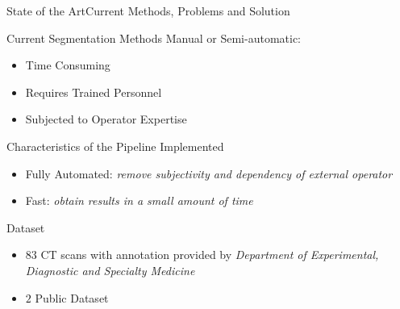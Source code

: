 \documentclass{standalone}
\begin{document}
	
	\begin{frame}{State of the Art}{Current Methods, Problems and Solution}
		
		\begin{alertblock}{Current Segmentation Methods}
			Manual or Semi-automatic: 
			\begin{itemize}
				\item Time Consuming
				\item Requires Trained Personnel
				\item Subjected to Operator Expertise
			\end{itemize}
		\end{alertblock}
		
		\begin{block}{Characteristics of the Pipeline Implemented}
			\begin{itemize}
				\item Fully Automated: \emph{remove subjectivity and dependency of external operator}
				\item Fast: \emph{obtain results in a small amount of time }
			\end{itemize}
		\end{block}
	
		\begin{exampleblock}{Dataset}
			\begin{itemize}
				\item $83$ CT scans with annotation provided by \emph{Department of Experimental, Diagnostic and Specialty Medicine}
				\item $2$ Public Dataset
			\end{itemize}
		\end{exampleblock}
	\end{frame}
\end{document}
